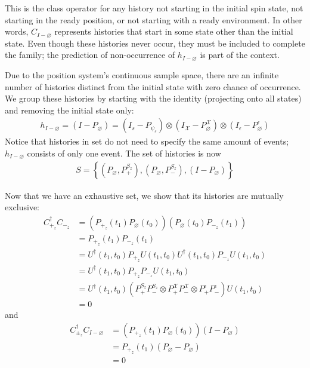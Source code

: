 This is the class operator for any history not starting in the initial spin state, not starting in the ready position, or not starting with a ready environment. In other words, $C_{I-\varnothing}$ represents histories that start in some state other than the initial state. Even though these histories never occur, they must be included to complete the family; the prediction of non-occurrence of $h_{I - \varnothing}$ is part of the context.

Due to the position system's continuous sample space, there are an infinite number of histories distinct from the initial state with zero chance of occurrence. We group these histories by starting with the identity (projecting onto all states) and removing the initial state only:
\begin{align}
  h_{I-\varnothing} = \left(I - P_\varnothing \right) = \left(I_s - P_{\psi_s}\right) \otimes \left(I_\mathcal{X} - P_{\varnothing}^\mathcal{X} \right) \otimes \left(I_\epsilon - P^\epsilon_\varnothing \right)
\end{align}
Notice that histories in set do not need to specify the same amount of events; $h_{I-\varnothing}$ consists of only one event. The set of histories is now
\begin{align}
  S = \left\{\left( P_\varnothing, P^{S_z}_+ \right), \left(P_\varnothing, P^{S_z}_- \right), \left(I - P_\varnothing \right) \right\}
\end{align}

Now that we have an exhaustive set, we show that its histories are mutually exclusive:
\begin{align}
  C_{+_z}^\dagger C_{-_z} &= \left( P_{+_z}(t_1)  P_\varnothing(t_0) \right) \left(P_\varnothing(t_0) P_{-_z}(t_1) \right) \\ \nonumber
  &= P_{+_z}(t_1) P_{-_z}(t_1) \\ \nonumber
  &= U^\dagger(t_1, t_0) P_{+_z} U(t_1, t_0) U^\dagger(t_1, t_0) P_{-_z} U(t_1, t_0)  \\ \nonumber
  &= U^\dagger(t_1, t_0) P_{+_z}P_{-_z} U(t_1, t_0) \\ \nonumber
  &= U^\dagger(t_1, t_0) \left( P^{S_z}_+ P^{S_z}_-  \otimes P^\mathcal{X}_+ P^\mathcal{X}_- \otimes P^\epsilon_+ P^\epsilon_- \right) U(t_1, t_0) \\ \nonumber
  &= 0
\end{align} and
\begin{align}
  C_{\pm_z}^\dagger C_{I-\varnothing} &= \left( P_{+_z}(t_1)  P_\varnothing(t_0) \right) \left(I-P_\varnothing\right) \\ \nonumber
  &= P_{+_z}(t_1)  \left(P_\varnothing - P_\varnothing \right)\\ \nonumber
  &= 0
\end{align}

